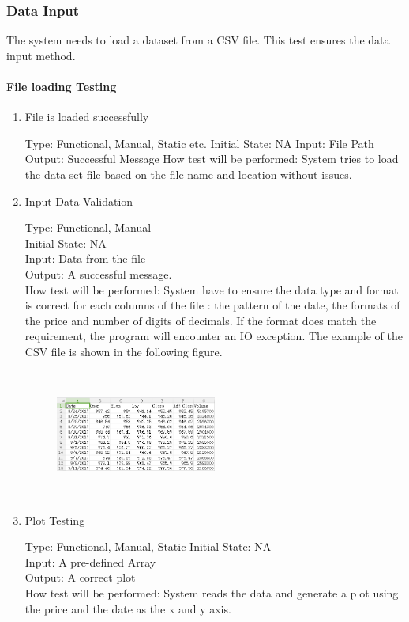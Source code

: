 \documentclass[12pt, titlepage]{article}
\begin{document}
\subsubsection{Data Input}
The system needs to load a dataset from a CSV file. This test ensures the data input method. 
\paragraph{File loading Testing }

\begin{enumerate}

\item{File is loaded successfully\\}

Type: Functional, Manual, Static etc.
Initial State: NA
Input: File Path
Output: Successful Message
How test will be performed: System tries to load the data set file based on the file name and location without issues.

\item{Input Data Validation\\}

Type: Functional, Manual\\
Initial State: NA\\
Input: Data from the file\\
Output: A successful message.\\
How test will be performed: System have to ensure the data type and format is
correct for each columns of the file : the pattern of the date, the formats
of the price and number of digits of decimals. If the format does match the requirement, the program will encounter an IO exception.
The example of the CSV file is shown in the following figure. 

~\newline
\begin{figure}[h!]
\begin{center}
{
\includegraphics[width=0.5\textwidth]{amazon.png}
}
\caption{\label{Input Data}}
\end{center}
\end{figure}

~\newline
\item{Plot Testing\\}

Type: Functional, Manual, Static
Initial State: NA\\
Input: A pre-defined Array\\
Output: A correct plot\\
How test will be performed: System reads the data and generate a plot using the price and the date as the x and y axis.\\

\end{enumerate}
\end{document}
